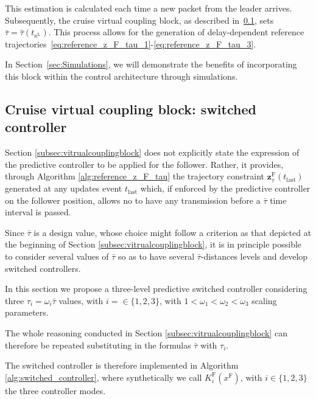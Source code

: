 \documentclass[letterpaper, 10 pt, conference]{ieeeconf}
\theoremstyle{definition}
\theoremstyle{nopoint}
\newcommand{\tildeAdd}{~}
\begin{document}
This estimation is calculated each time a new packet from the leader arrives. Subsequently, the cruise virtual coupling block, as described in\tildeAdd\ref{subsec:switchedvitrualcouplingblock}, sets $\bar{\tau}=\hat{\tau}(t_{\kappa^\mathrm{L}})$. This process allows for the generation of delay-dependent reference trajectories\tildeAdd\eqref{eq:reference_z_F_tau_1}-\eqref{eq:reference_z_F_tau_3}.

In Section\tildeAdd\ref{sec:Simulations}, we will demonstrate the benefits of incorporating this block within the control architecture through simulations.



\subsection{Cruise virtual coupling block: switched controller}
 \label{subsec:switchedvitrualcouplingblock}  

Section \ref{subsec:vitrualcouplingblock} does not explicitly state the expression of the predictive controller to be applied for the follower. Rather, it provides, through  Algorithm \ref{alg:reference_z_F_tau} the trajectory constraint $\mathbf{z}_{\bar{\tau}}^\mathrm{F}(t_{\mathrm{last}})$ generated at any updates event $t_{\mathrm{last}}$ which, if enforced by the predictive controller on the follower position, allows no to have any transmission before a $\bar{\tau}$ time interval is passed. 

Since $\bar{\tau}$ is a design value, whose choice might follow a criterion as that depicted at the beginning of Section \ref{subsec:vitrualcouplingblock}, it is in principle possible to consider several values of $\bar{\tau}$ so as to have several $\bar{\tau}$-distances levels and develop switched controllers. 

In this section we propose a three-level predictive switched controller considering three $\tau_i=\omega_i \bar{\tau}$ values, with $i=\in \{1,2,3\}$, with $1<\omega_1 < \omega_2< \omega_3$ scaling parameters. 

The whole reasoning conducted in Section \ref{subsec:vitrualcouplingblock} can therefore be repeated substituting in the formulas $\bar{\tau}$ with $\tau_i$. 

The switched controller is therefore implemented in Algorithm \ref{alg:switched_controller}, where synthetically we call $K^{\mathrm{F}}_i(x^{\mathrm{F}})$, with $i\in \{1,2,3\}$ the three controller modes.
\end{document}
